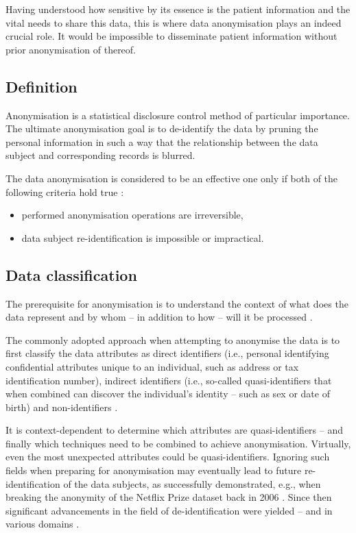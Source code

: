 \documentclass[a4paper,twoside,12pt]{book}
\begin{document}
Having understood how sensitive by its essence is the patient information and the vital needs to share this data, this is where data anonymisation plays an indeed crucial role. It would be impossible to disseminate patient information without prior anonymisation of thereof.

\subsection{Definition}

Anonymisation is a statistical disclosure control method of particular importance. The ultimate anonymisation goal is to de-identify the data by pruning the personal information in such a way that the relationship between the data subject and corresponding records is blurred.

The data anonymisation is considered to be an effective one only if both of the following criteria hold true \cite{bib:anonymization_taxa}:
\begin{itemize}
\item performed anonymisation operations are irreversible,
\item data subject re-identification is impossible or impractical.
\end{itemize}

\subsection{Data classification}

The prerequisite for anonymisation is to understand the context of what does the data represent and by whom – in addition to how – will it be processed \cite{bib:anonymizing_health_data}. 

The commonly adopted approach when attempting to anonymise the data is to first classify the data attributes as direct identifiers (i.e., personal identifying confidential attributes unique to an individual, such as address or tax identification number), indirect identifiers (i.e., so-called quasi-identifiers that when combined can discover the individual's identity – such as sex or date of birth) and non-identifiers \cite{bib:privacy_unesco_bigdata,bib:anonymizing_health_data}.

It is context-dependent to determine which attributes are quasi-identifiers – and finally which techniques need to be combined to achieve anonymisation. Virtually, even the most unexpected attributes could be quasi-identifiers. Ignoring such fields when preparing for anonymisation may eventually lead to future re-identification of the data subjects, as successfully demonstrated, e.g., when breaking the anonymity of the Netflix Prize dataset back in 2006 \cite{bib:netflix}. Since then significant advancements in the field of de-identification were yielded – and in various domains \cite{bib:netflix_decade_later}.
\end{document}
